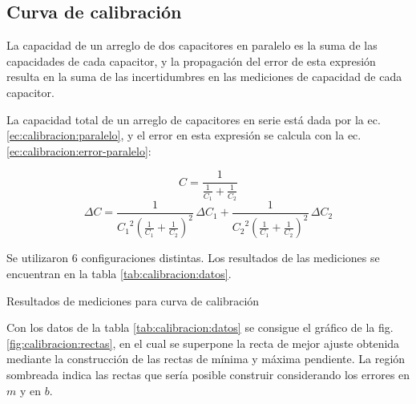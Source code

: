 \subsection{Curva de calibración}
\label{sec:calibracion}

La capacidad de un arreglo de dos capacitores en paralelo es la suma de las
capacidades de cada capacitor, y la propagación del error de esta expresión 
resulta en la suma de las incertidumbres en las mediciones de capacidad de cada
capacitor.

La capacidad total de un arreglo de capacitores en serie está dada por la ec.
\ref{ec:calibracion:paralelo}, y el error en esta expresión se calcula con la
ec. \ref{ec:calibracion:error-paralelo}:

\vspace{10mm}
\begin{equation}
    \label{ec:calibracion:paralelo}
    C = \frac{1}{\frac{1}{C_1} + \frac{1}{C_2}}
\end{equation}
\vspace{10mm}
\begin{equation}
    \label{ec:calibracion:error-paralelo}
    \Delta C =
    \frac{1}{{C_1}^2 \left( \frac{1}{C_1} + \frac{1}{C_2} \right)^2} \, \Delta C_1 + 
    \frac{1}{{C_2}^2 \left( \frac{1}{C_1} + \frac{1}{C_2} \right)^2} \, \Delta C_2
\end{equation}
\vspace{10mm}

Se utilizaron 6 configuraciones distintas. Los resultados de las mediciones se
encuentran en la tabla \ref{tab:calibracion:datos}.

\vspace{10mm}
\begin{table}[H]
    \centering
    \caption{Resultados de mediciones para curva de calibración}
    \label{tab:calibracion:datos}
\end{table}
\vspace{10mm}

Con los datos de la tabla \ref{tab:calibracion:datos} se consigue el gráfico
de la fig. \ref{fig:calibracion:rectas}, en el cual se superpone la recta
de mejor ajuste obtenida mediante la construcción de las rectas de mínima y 
máxima pendiente. La región sombreada indica las rectas que sería posible 
construir considerando los errores en $m$ y en $b$.

